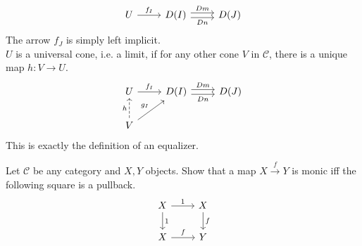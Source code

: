 \begin{answer}
\begin{enumerate}
    \[
      \begin{tikzcd}
        U \arrow{r}{f_I} & D(I) \arrow[r,shift left, "Dm"] \arrow[r,shift right,swap,"Dn"] & D(J)
      \end{tikzcd}
    \]
    The arrow $f_J$ is simply left implicit.\\
    $U$ is a universal cone, i.e. a limit, if for any other cone $V$ in $\mathscr{C}$, there is a unique map
    $h : V \to U$.
    \[
      \begin{tikzcd}
        U \arrow{r}{f_I} & D(I) \arrow[r,shift left, "Dm"] \arrow[r,shift right,swap,"Dn"] & D(J) \\
        V \arrow{ur}{g_I} \arrow[dashed]{u}{h}& &
      \end{tikzcd}
    \]
    This is exactly the definition of an equalizer.
  \end{enumerate}
\end{answer}

\begin{exercise}
  Let $\mathscr{C}$ be any category and $X, Y$ objects.
  Show that a map $X \overset{f}{\to} Y$ is monic iff the following square is a pullback.
  \[
    \begin{tikzcd}
      X \arrow{r}{1}  \arrow{d}{1}  & X \arrow{d}{f}    \\
      X \arrow{r}{f}                & Y                  
    \end{tikzcd}
  \]
\end{exercise}

